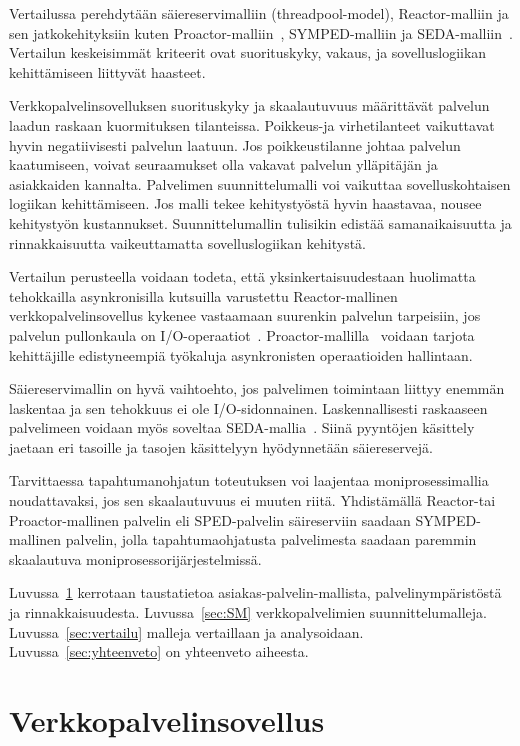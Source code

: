 \documentclass[finnish]{tktltiki2}%
\theoremstyle{definition}
\theoremstyle{remark}
\begin{document}
Vertailussa perehdytään säiereservimalliin (threadpool-model), Reactor-malliin\cite{schmidt_reactor:_1995} ja sen jatkokehityksiin
kuten Proactor-malliin~\cite{hu_applying_1998}, SYMPED-malliin ja SEDA-malliin~\cite{welsh_seda_2001}.
Vertailun keskeisimmät kriteerit ovat suorituskyky, vakaus, ja
sovelluslogiikan kehittämiseen liittyvät haasteet.

Verkkopalvelinsovelluksen suorituskyky ja skaalautuvuus
määrittävät palvelun laadun raskaan kuormituksen tilanteissa.
Poikkeus-ja virhetilanteet vaikuttavat hyvin negatiivisesti
palvelun laatuun. Jos poikkeustilanne johtaa
palvelun kaatumiseen, voivat seuraamukset olla vakavat
palvelun ylläpitäjän ja asiakkaiden kannalta.
Palvelimen suunnittelumalli voi vaikuttaa 
sovelluskohtaisen logiikan kehittämiseen.
Jos malli tekee kehitystyöstä hyvin haastavaa,
nousee kehitystyön kustannukset.
Suunnittelumallin tulisikin edistää
samanaikaisuutta ja rinnakkaisuutta vaikeuttamatta
sovelluslogiikan kehitystä.

Vertailun perusteella voidaan todeta, että
yksinkertaisuudestaan huolimatta tehokkailla asynkronisilla
kutsuilla varustettu Reactor-mallinen verkkopalvelinsovellus
kykenee vastaamaan suurenkin palvelun tarpeisiin, jos palvelun
pullonkaula on I/O-operaatiot~\cite{schmidt_reactor:_1995}.
Proactor-mallilla~\cite{hu_applying_1998} voidaan tarjota kehittäjille edistyneempiä työkaluja
asynkronisten operaatioiden hallintaan.

Säiereservimallin on hyvä vaihtoehto, jos palvelimen
toimintaan liittyy enemmän laskentaa ja sen tehokkuus ei ole I/O-sidonnainen.
Laskennallisesti raskaaseen palvelimeen voidaan myös soveltaa SEDA-mallia~\cite{welsh_seda_2001}.
Siinä pyyntöjen käsittely jaetaan eri tasoille ja tasojen käsittelyyn
hyödynnetään säiereservejä.

Tarvittaessa tapahtumanohjatun toteutuksen voi laajentaa moniprosessimallia noudattavaksi,
jos sen skaalautuvuus ei muuten riitä.
Yhdistämällä Reactor-tai Proactor-mallinen palvelin eli SPED-palvelin säireserviin
saadaan SYMPED-mallinen palvelin, jolla tapahtumaohjatusta palvelimesta
saadaan paremmin skaalautuva moniprosessorijärjestelmissä.

Luvussa~\ref{vps} kerrotaan taustatietoa asiakas-palvelin-mallista, palvelinympäristöstä
ja rinnakkaisuudesta.
Luvussa~\ref{sec:SM} verkkopalvelimien suunnittelumalleja. Luvussa~\ref{sec:vertailu}
malleja vertaillaan ja analysoidaan. Luvussa~\ref{sec:yhteenveto} on yhteenveto aiheesta.

\section{Verkkopalvelinsovellus}\label{vps}
\end{document}
